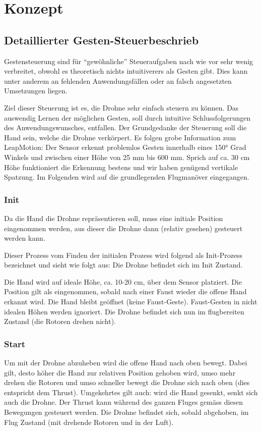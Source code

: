 \chapter{Konzept}

\section{Detaillierter Gesten-Steuerbeschrieb}

Gestensteuerung sind für "`gewöhnliche"' Steueraufgaben nach wie vor sehr wenig verbreitet, obwohl es theoretisch nichts intuitiverers als Gesten gibt. Dies kann unter anderem an fehlenden Anwendungsfällen oder an falsch angesetzten Umsetzungen liegen.

Ziel dieser Steuerung ist es, die Drohne sehr einfach steuern zu können. Das auswendig Lernen der möglichen Gesten, soll durch intuitive Schlussfolgerungen des Anwendungswunsches, entfallen. Der Grundgedanke der Steuerung soll die Hand sein, welche die Drohne verkörpert.
Es folgen grobe Information zum LeapMotion: Der Sensor erkennt problemlos Gesten innerhalb eines 150° Grad Winkels und zwischen einer Höhe von 25 mm bis 600 mm. Sprich auf ca. 30 cm Höhe funktioniert die Erkennung bestens und wir haben genügend vertikale Spatzung.
Im Folgenden wird auf die grundlegenden Flugmanöver eingegangen.

\subsection{Init}

Da die Hand die Drohne repräsentieren soll, muss eine initiale Position eingenommen werden, aus dieser die Drohne dann (relativ gesehen) gesteuert werden kann.

Dieser Prozess vom Finden der initialen Prozess wird folgend als Init-Prozess bezeichnet und sieht wie folgt aus:
Die Drohne befindet sich im Init Zustand.

Die Hand wird auf ideale Höhe, ca. 10-20 cm, über dem Sensor platziert. Die Position gilt als eingenommen, sobald nach einer Faust wieder die offene Hand erkannt wird. Die Hand bleibt geöffnet (keine Faust-Geste). Faust-Gesten in nicht idealen Höhen werden ignoriert.
Die Drohne befindet sich nun im flugbereiten Zustand (die Rotoren drehen nicht).

\subsection{Start}
Um mit der Drohne abzuheben wird die offene Hand nach oben bewegt. Dabei gilt, desto höher die Hand zur relativen Position gehoben wird, umso mehr drehen die Rotoren und umso schneller bewegt die Drohne sich nach oben (dies entspricht dem Thrust). Umgekehrtes gilt auch: wird die Hand gesenkt, senkt sich auch die Drohne.
Der Thrust kann während des ganzen Fluges gemäss diesen Bewegungen gesteuert werden.
Die Drohne befindet sich, sobald abgehoben, im Flug Zustand (mit drehende Rotoren und in der Luft).

